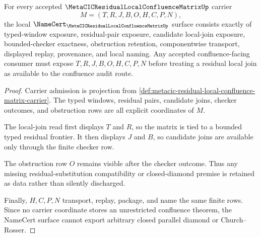\begin{theorem}
\label{thm:metacic-residual-local-confluence-matrix-namecert-obligations}
For every accepted $\MetaCICResidualLocalConfluenceMatrixUp$ carrier
$$
M=(T,R,J,B,O,H,C,P,N),
$$
the local $\NameCert_{\MetaCICResidualLocalConfluenceMatrixUp}$ surface consists exactly of typed-window exposure, residual-pair exposure, candidate local-join exposure, bounded-checker exactness, obstruction retention, componentwise transport, displayed replay, provenance, and local naming. Any accepted confluence-facing consumer must expose $T,R,J,B,O,H,C,P,N$ before treating a residual local join as available to the confluence audit route.
\end{theorem}
\begin{proof}
Carrier admission is projection from \autoref{def:metacic-residual-local-confluence-matrix-carrier}. The typed windows, residual pairs, candidate joins, checker outcomes, and obstruction rows are all explicit coordinates of $M$.

The local-join read first displays $T$ and $R$, so the matrix is tied to a bounded typed residual frontier. It then displays $J$ and $B$, so candidate joins are available only through the finite checker row.

The obstruction row $O$ remains visible after the checker outcome. Thus any missing residual-substitution compatibility or closed-diamond premise is retained as data rather than silently discharged.

Finally, $H,C,P,N$ transport, replay, package, and name the same finite rows. Since no carrier coordinate stores an unrestricted confluence theorem, the NameCert surface cannot export arbitrary closed parallel diamond or Church--Rosser.
\end{proof}

